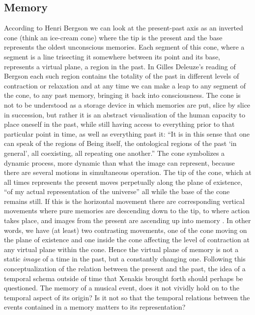 \subsection*{Memory}
\label{sec:memory}


According to Henri Bergson we can look at the present-past axis as an inverted cone (think an ice-cream cone) where the tip is the present and the base represents the oldest unconscious memories. Each segment of this cone, where a segment is a line trisecting it somewhere between its point and its base, represents a virtual plane, a region in the past. \citep[][Ch.3]{bergson91} 
In Gilles Deleuze's reading of Bergson each such region contains the totality of the past in different levels of contraction or relaxation and at any time we can make a leap to any segment of the cone, to any past memory, bringing it back into consciousness. \citep[][60]{deleuze88} The cone is not to be understood as a storage device in which memories are put, slice by slice in succession, but rather it is an abstract visualisation of the human capacity to place oneself in the past, while still having access to everything prior to that particular point in time, as well as everything past it: ``It is in this sense that one can speak of the regions of Being itself, the ontological regions of the past `in general', all coexisting, all repeating one another.'' \citep[61]{deleuze88}
The cone symbolizes a dynamic process, more dynamic than what the image can represent, because there are several motions in simultaneous operation. The tip of the cone, which at all times represents the present moves perpetually along the plane of existence, ``of my actual representation of the universe'' \citep[152]{bergson91} all while the base of the cone remains still. If this is the horizontal movement there are corresponding vertical movements where pure memories are descending down to the tip, to where action takes place, and images from the present are ascending up into memory \citep[See also][47-8]{lawlor03}. In other words, we have (at least) two contrasting movements, one of the cone moving on the plane of existence and one inside the cone affecting the level of contraction at any virtual plane within the cone. Hence the virtual plane of memory is not a static \emph{image} of a time in the past, but a constantly changing one. Following this conceptualization of the relation between the present and the past, the idea of a temporal schema outside of time that Xenakis brought forth should perhaps be questioned. The memory of a musical event, does it not vividly hold on to the temporal aspect of its origin? Is it not so that the temporal relations between the events contained in a memory matters to its representation?

